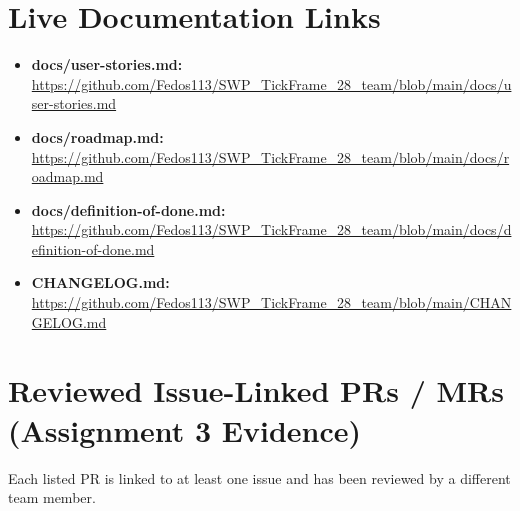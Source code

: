 \documentclass[11pt,a4paper]{article}
\begin{document}
\section{Live Documentation Links}

\begin{itemize}[leftmargin=*]
    \item \textbf{docs/user-stories.md:} \url{https://github.com/Fedos113/SWP_TickFrame_28_team/blob/main/docs/user-stories.md}
    \item \textbf{docs/roadmap.md:} \url{https://github.com/Fedos113/SWP_TickFrame_28_team/blob/main/docs/roadmap.md}
    \item \textbf{docs/definition-of-done.md:} \url{https://github.com/Fedos113/SWP_TickFrame_28_team/blob/main/docs/definition-of-done.md}
    \item \textbf{CHANGELOG.md:} \url{https://github.com/Fedos113/SWP_TickFrame_28_team/blob/main/CHANGELOG.md}
\end{itemize}

\section{Reviewed Issue-Linked PRs / MRs (Assignment 3 Evidence)}

Each listed PR is linked to at least one issue and has been reviewed by a different team member.
\end{document}
